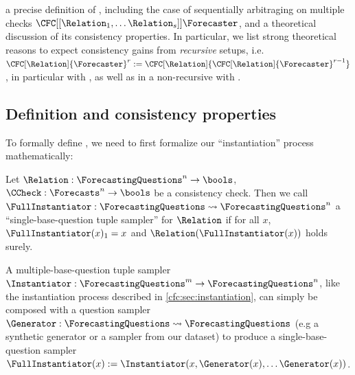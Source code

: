 
 a precise definition of \CFCaster{}, including the case of sequentially arbitraging on multiple checks $\CFC[[\Relation_1,\dots\Relation_s]]{\Forecaster}$, and a theoretical discussion of its consistency properties. In particular, we list strong theoretical reasons to expect consistency gains from \emph{recursive} \CFCaster{} setups, i.e. $\CFC[\Relation]{\Forecaster}^r:=\CFC[\Relation]{\CFC[\Relation]{\Forecaster}^{r-1}}$, in particular with \NegChecker{}, as well as in a non-recursive \CFCaster{} with \ExpectedEvidenceChecker{}.

\subsection{Definition and consistency properties}
\label{cfc:sec:cfcaster-theory}
\label{cfc:app:cfcaster}

To formally define \CFCaster{}, we need to first formalize our ``instantiation'' process mathematically:

\begin{definition}
Let $\Relation:\ForecastingQuestions^n\to\bools$, $\CCheck:\Forecasts^n\to\bools$ be a consistency check. Then we call $\FullInstantiator:\ForecastingQuestions\rightsquigarrow\ForecastingQuestions^n$ a ``single-base-question tuple sampler'' for $\Relation$ if for all $x$, $\FullInstantiator(x)_1=x$ and $\Relation(\FullInstantiator(x))$ holds surely.
\label{cfc:def:instantiator}
\end{definition}

A multiple-base-question tuple sampler $\Instantiator:\ForecastingQuestions^m\to\ForecastingQuestions^n$, like the instantiation process described in \ref{cfc:sec:instantiation}, can simply be composed with a question sampler $\Generator:\ForecastingQuestions\rightsquigarrow\ForecastingQuestions$ (e.g a synthetic generator or a sampler from our dataset) to produce a single-base-question sampler $\FullInstantiator(x):=\Instantiator(x,\Generator(x),\dots\Generator(x))$.

